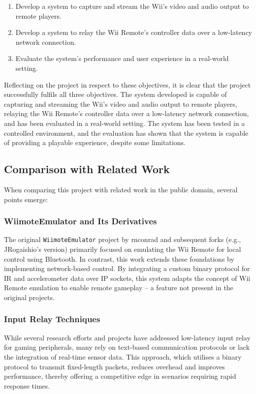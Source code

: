 \begin{enumerate}
	\item  Develop a system to capture and stream the Wii’s video and audio output to remote players.
	\item Develop a system to relay the Wii Remote’s controller data over a low-latency network connection.
	\item Evaluate the system’s performance and user experience in a real-world setting.
\end{enumerate}

Reflecting on the project in respect to these objectives, it is clear that the project successfully fulfils all three objectives. The system developed is capable of capturing and streaming the Wii’s video and audio output to remote players, relaying the Wii Remote’s controller data over a low-latency network connection, and has been evaluated in a real-world setting. The system has been tested in a controlled environment, and the evaluation has shown that the system is capable of providing a playable experience, despite some limitations.

\subsection{Comparison with Related Work}
When comparing this project with related work in the public domain, several points emerge:

\subsubsection{WiimoteEmulator and Its Derivatives}
The original \texttt{WiimoteEmulator} project by rnconrad and subsequent forks (e.g., JRogaishio's version) primarily focused on emulating the Wii Remote for local control using Bluetooth. In contrast, this work extends these foundations by implementing network-based control. By integrating a custom binary protocol for IR and accelerometer data over IP sockets, this system adapts the concept of Wii Remote emulation to enable remote gameplay -- a feature not present in the original projects.

\subsubsection{Input Relay Techniques}
While several research efforts and projects have addressed low-latency input relay for gaming peripherals, many rely on text-based communication protocols or lack the integration of real-time sensor data. This approach, which utilises a binary protocol to transmit fixed-length packets, reduces overhead and improves performance, thereby offering a competitive edge in scenarios requiring rapid response times.

